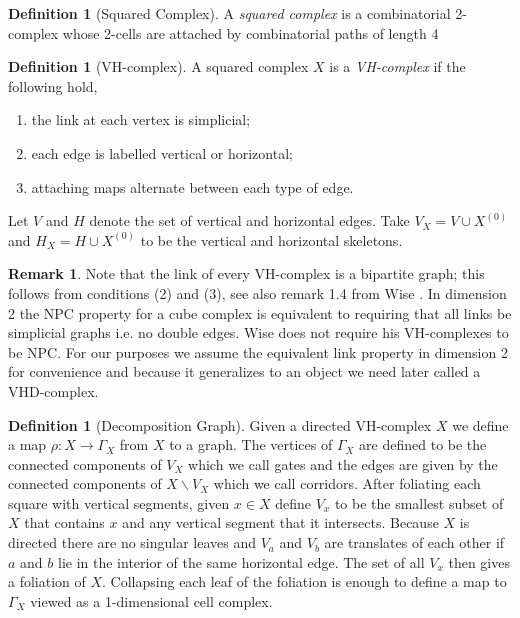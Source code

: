 \documentclass[12pt,parskip=full]{report}
\theoremstyle{plain}
\theoremstyle{definition}
\newtheorem{rmk}[thm]{Remark}
\newtheorem{dfn}[thm]{Definition}
\begin{document}
\begin{dfn}
    [Squared Complex]
    A \emph{squared complex} is a combinatorial 2-complex whose 2-cells are attached by combinatorial paths of length 4
\end{dfn}

\begin{dfn}
    [VH-complex]
    A squared complex $X$ is a \emph{VH-complex} if the following hold,
    \begin{enumerate}
        \item the link at each vertex is simplicial;
        \item each edge is labelled vertical or horizontal;
        \item attaching maps alternate between each type of edge.
    \end{enumerate}
    Let $V$ and $H$ denote the set of vertical and horizontal edges. Take $V_X = V \cup X^{(0)}$ and $H_X = H \cup X^{(0)}$ to be the vertical and horizontal skeletons. 
\end{dfn}

\begin{rmk}
Note that the link of every VH-complex is a bipartite graph; this follows from conditions (2) and (3), see also remark 1.4 from Wise \cite{wisethesis}. In dimension 2 the NPC property for a cube complex is equivalent to requiring that all links be simplicial graphs i.e. no double edges. Wise does not require his VH-complexes to be NPC. For our purposes we assume the equivalent link property in dimension 2 for convenience and because it generalizes to an object we need later called a VHD-complex.
    
\end{rmk}

\begin{dfn}
    [Decomposition Graph]
    \label{dfn:decompositiongraph}
    Given a directed VH-complex \(X\) we define a map \(\rho: X\to \Gamma_X\) from \(X\) to a graph. The vertices of \(\Gamma_X\) are defined to be the connected components of \(V_X\) which we call gates and the edges are given by the connected components of \(X\smallsetminus V_X\) which we call corridors. After foliating each square with vertical segments, given \(x\in X\) define \(V_x\) to be the smallest subset of \(X\) that contains \(x\) and any vertical segment that it intersects. Because \(X\) is directed there are no singular leaves and \(V_a\) and \(V_b\) are translates of each other if \(a\) and \(b\) lie in the interior of the same horizontal edge. The set of all \(V_x\) then gives a foliation of \(X\). Collapsing each leaf of the foliation is enough to define a map to \(\Gamma_X\) viewed as a 1-dimensional cell complex. 
\end{dfn}
\end{document}
